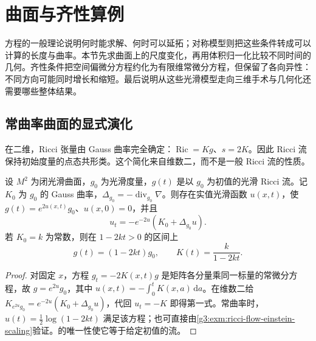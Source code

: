 
% 
% 
% 

\section{曲面与齐性算例}
\label{g3:sec:2705}

方程的一般理论说明何时能求解、何时可以延拓；对称模型则把这些条件转成可以计算的长度与曲率。本节先求曲面上的尺度变化，再用体积归一化比较不同时间的几何。齐性条件把空间偏微分方程约化为有限维常微分方程，但保留了各向异性：不同方向可能同时增长和缩短。最后说明从这些光滑模型走向三维手术与几何化还需要哪些整体结果。

\subsection{常曲率曲面的显式演化}
\label{g3:subsec:2705:01}
在二维，Ricci 张量由 Gauss 曲率完全确定：\(\operatorname{Ric}=Kg\)、\(s=2K\)。因此 Ricci 流保持初始度量的点态共形类。这个简化来自维数二，而不是一般 Ricci 流的性质。

\begin{proposition}\label{g3:prop:ricci-flow-surface-conformal}
	设 \(M^2\) 为闭光滑曲面，\(g_0\) 为光滑度量，\(g(t)\) 是以 \(g_0\) 为初值的光滑 Ricci 流。记 \(K_0\) 为 \(g_0\) 的 Gauss 曲率，\(\Delta_{g_0}=-\operatorname{div}_{g_0}\nabla\)。则存在实值光滑函数 \(u(x,t)\)，使 \(g(t)=e^{2u(x,t)}g_0\)、\(u(x,0)=0\)，并且
	\begin{equation}\label{g3:eq:ricci-flow-surface-conformal}
		u_t=-e^{-2u}(K_0+\Delta_{g_0}u).
	\end{equation}
	若 \(K_0=k\) 为常数，则在 \(1-2kt>0\) 的区间上
	\begin{equation}\label{g3:eq:ricci-flow-constant-surface}
		g(t)=(1-2kt)g_0,\qquad K(t)=\frac{k}{1-2kt}.
	\end{equation}
\end{proposition}
\begin{proof}
	对固定 \(x\)，方程 \(g_t=-2K(x,t)g\) 是矩阵各分量乘同一标量的常微分方程，故 \(g=e^{2u}g_0\)，其中 \(u(x,t)=-\int_0^tK(x,a)\,\mathrm da\)。在维数二给
	\(K_{e^{2u}g_0}=e^{-2u}(K_0+\Delta_{g_0}u)\)，代回 \(u_t=-K\) 即得第一式。常曲率时，\(u(t)=\tfrac12\log(1-2kt)\) 满足该方程；也可直接由\cref{g3:exm:ricci-flow-einstein-scaling}验证。的唯一性使它等于给定初值的流。
\end{proof}

